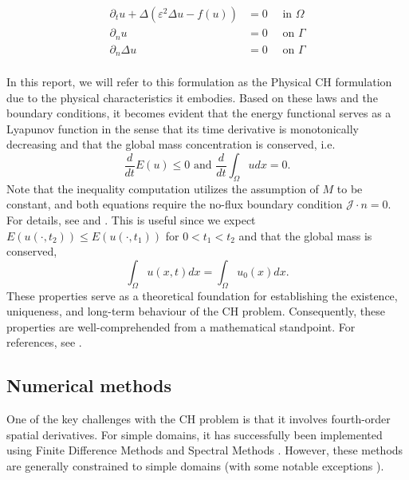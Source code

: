 \documentclass[11pt]{article}
\theoremstyle{remark}
\renewcommand{\le}{\leqslant}
\numberwithin{equation}{section}
\begin{document}
\begin{equation}
\label{eq:strongch}
    \begin{split}
\partial _{t} u + \Delta  \left(  \varepsilon^2  \Delta u - f( u) \right)   &=0  \quad \text{ in } \Omega  \\
\partial _{n} u &= 0 \quad \text{ on } \Gamma  \\
\partial _{n}    \Delta u       &= 0 \quad \text{ on } \Gamma  \\
    \end{split}
\end{equation}

In this report, we will refer to this formulation as the Physical CH formulation due to the physical characteristics it embodies.
Based on these laws and the boundary conditions, it becomes evident that the energy functional serves as a Lyapunov function in the sense that its time derivative is monotonically decreasing and that the global mass concentration is conserved, i.e.
\begin{equation}
\label{eq:mass_cons_energy_decrease}
\frac{d}{dt} E( u) \le   0 \text{ and }\frac{d}{dt} \int_{\Omega }^{}  u dx = 0.
\end{equation}
Note that the inequality computation utilizes the assumption of $M$ to be constant, and both equations require the no-flux boundary condition $\mathcal{J} \cdot n = 0$.
For details, see \cite[Equation 17]{lee2014physical} and \cite[Equation 1.7]{garcke2020weak}.
This is useful since we expect $E( u( \cdot , t_{2}) ) \le  E( u( \cdot , t_{1}) ) $ for $0 < t_{1} < t_{2} $ and that the global mass is conserved,
\begin{equation}
    \int_{\Omega }^{} u ( x,t)  dx = \int_{\Omega }^{} u_{0}(x)  dx.
\end{equation}
These properties serve as a theoretical foundation for establishing the existence, uniqueness, and long-term behaviour of the CH problem. Consequently, these properties are well-comprehended from a mathematical standpoint. For
references, see \cite{abels2007convergence, cherfils2011cahn, elliott1986cahn}.

\subsection{Numerical methods}%
\label{sub:numerical_methods}

One of the key challenges with the CH problem is that it involves fourth-order spatial derivatives. For simple domains, it has successfully been implemented using Finite Difference Methods \cite{furihata2001stable,
cheng2019energy} and Spectral Methods \cite{liu2003phase, he2009class}. However, these methods are generally constrained to simple domains (with some notable exceptions \cite{li2013conservative, shen2009efficient, feng2009fourier}).
\end{document}
